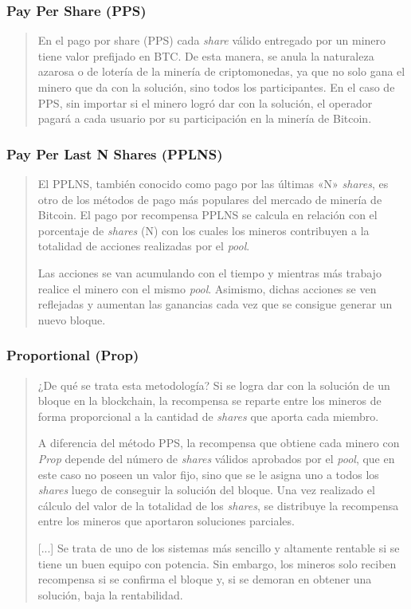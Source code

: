 \documentclass[12pt,a4paper,twoside]{book}
\begin{document}
\subsubsection{Pay Per Share (PPS)}
\begin{quotation}
En el pago por share (PPS) cada \textit{share} válido entregado por un minero tiene valor prefijado en BTC. De esta manera, se anula la naturaleza azarosa o de lotería de la minería de criptomonedas, ya que no solo gana el minero que da con la solución, sino todos los participantes. En el caso de PPS, sin importar si el minero logró dar con la solución, el operador pagará a cada usuario por su participación en la minería de Bitcoin. \cite{shares}
\end{quotation}

\subsubsection{Pay Per Last N Shares (PPLNS)}
\begin{quotation}
El PPLNS, también conocido como pago por las últimas «N» \textit{shares}, es otro de los métodos de pago más populares del mercado de minería de Bitcoin. El pago por recompensa PPLNS se calcula en relación con el porcentaje de \textit{shares} (N) con los cuales los mineros contribuyen a la totalidad de acciones realizadas por el \textit{pool}.

Las acciones se van acumulando con el tiempo y mientras más trabajo realice el minero con el mismo \textit{pool}. Asimismo, dichas acciones se ven reflejadas y aumentan las ganancias cada vez que se consigue generar un nuevo bloque. \cite{shares}
\end{quotation}

\subsubsection{Proportional (Prop)}
\begin{quotation}
¿De qué se trata esta metodología? Si se logra dar con la solución de un bloque en la blockchain, la recompensa se reparte entre los mineros de forma proporcional a la cantidad de \textit{shares} que aporta cada miembro.

A diferencia del método PPS, la recompensa que obtiene cada minero con \textit{Prop} depende del número de \textit{shares} válidos aprobados por el \textit{pool}, que en este caso no poseen un valor fijo, sino que se le asigna uno a todos los \textit{shares} luego de conseguir la solución del bloque. Una vez realizado el cálculo del valor de la totalidad de los \textit{shares}, se distribuye la recompensa entre los mineros que aportaron soluciones parciales.

[...] Se trata de uno de los sistemas más sencillo y altamente rentable si se tiene un buen equipo con potencia. Sin embargo, los mineros solo reciben recompensa si se confirma el bloque y, si se demoran en obtener una solución, baja la rentabilidad. \cite{shares}
\end{quotation}
\end{document}
